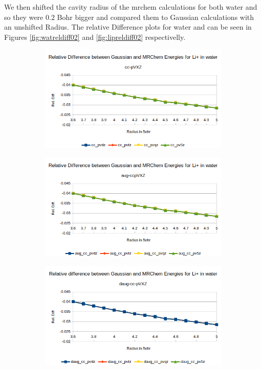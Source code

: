 \documentclass[../master_thesis.tex]{subfiles}
\begin{document}
We then shifted the cavity radius of the mrchem calculations for both water and
 so they were $0.2$ Bohr bigger and compared them to Gaussian calculations
with an unshifted Radius. The relative Difference plots for water and  can be seen
in Figures \ref{fig:watreldiff02} and \ref{fig:lipreldiff02} respectivelly.

\begin{figure}[h!]
  \centering
  \begin{subfigure}[b]{0.75\linewidth}
    \includegraphics[width=\linewidth]{img/lipreldiff.png}
  \end{subfigure}
  \begin{subfigure}[b]{0.75\linewidth}
    \includegraphics[width=\linewidth]{img/lipaugreldiff.png}
  \end{subfigure}
  \begin{subfigure}[b]{0.75\linewidth}
    \includegraphics[width=\linewidth]{img/lipdaugreldiff.png}

\end{subfigure}
\end{figure}
\end{document}
